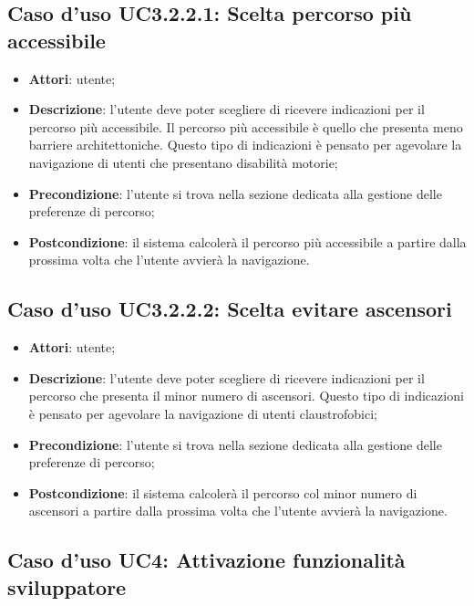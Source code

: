 \documentclass[../AnalisiDeiRequisiti.tex]{subfiles}
\begin{document}
\subsection{Caso d'uso UC3.2.2.1: Scelta percorso più accessibile}
\begin{itemize}
\item \textbf{Attori}: utente;
\item \textbf{Descrizione}: l'utente deve poter scegliere di ricevere indicazioni per il percorso più accessibile. Il percorso più accessibile è quello che presenta meno barriere architettoniche. Questo tipo di indicazioni è pensato per agevolare la navigazione di utenti che presentano disabilità motorie; 
      \item \textbf{Precondizione}: l'utente si trova nella sezione dedicata alla gestione delle preferenze di percorso;
    \item \textbf{Postcondizione}: il sistema calcolerà il percorso più accessibile a partire dalla prossima volta che l'utente avvierà la navigazione.
  \end{itemize}
\hypertarget{UC3.2.2.2}{}
\subsection{Caso d'uso UC3.2.2.2: Scelta evitare ascensori}
\begin{itemize}
\item \textbf{Attori}: utente;
\item \textbf{Descrizione}: l'utente deve poter scegliere di ricevere indicazioni per il percorso che presenta il minor numero di ascensori. Questo tipo di indicazioni è pensato per agevolare la navigazione di utenti claustrofobici; 
      \item \textbf{Precondizione}: l'utente si trova nella sezione dedicata alla gestione delle preferenze di percorso;
    \item \textbf{Postcondizione}: il sistema calcolerà il percorso col minor numero di ascensori a partire dalla prossima volta che l'utente avvierà la navigazione.
  \end{itemize}
\hypertarget{UC4}{}
\subsection{Caso d'uso UC4: Attivazione funzionalità sviluppatore}
\end{document}
